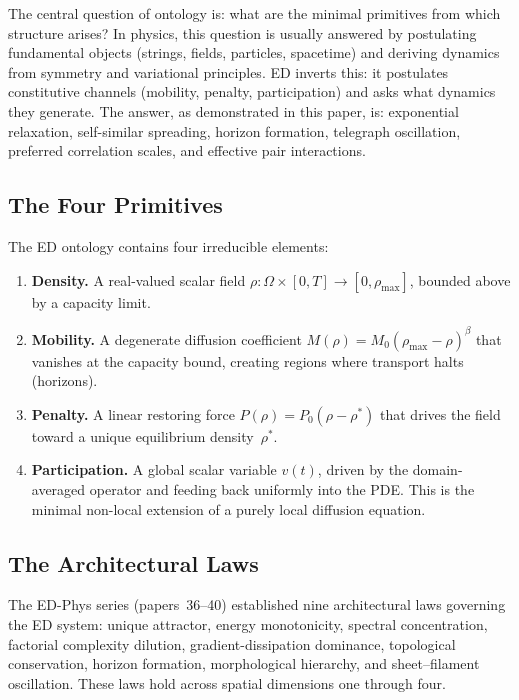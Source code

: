 \documentclass[11pt]{article}
\begin{document}
The central question of ontology is: what are the minimal primitives from which structure arises? In physics, this question is usually answered by postulating fundamental objects (strings, fields, particles, spacetime) and deriving dynamics from symmetry and variational principles. ED inverts this: it postulates constitutive channels (mobility, penalty, participation) and asks what dynamics they generate. The answer, as demonstrated in this paper, is: exponential relaxation, self-similar spreading, horizon formation, telegraph oscillation, preferred correlation scales, and effective pair interactions.

\subsection{The Four Primitives}

The ED ontology contains four irreducible elements:

\begin{enumerate}
  \item \textbf{Density.} A real-valued scalar field \(\rho\colon \Omega \times [0,T] \to [0, \rho_{\max}]\), bounded above by a capacity limit.

  \item \textbf{Mobility.} A degenerate diffusion coefficient \(M(\rho) = M_0(\rho_{\max} - \rho)^\beta\) that vanishes at the capacity bound, creating regions where transport halts (horizons).

  \item \textbf{Penalty.} A linear restoring force \(P(\rho) = P_0(\rho - \rho^*)\) that drives the field toward a unique equilibrium density~\(\rho^*\).

  \item \textbf{Participation.} A global scalar variable \(v(t)\), driven by the domain-averaged operator and feeding back uniformly into the PDE. This is the minimal non-local extension of a purely local diffusion equation.
\end{enumerate}

\subsection{The Architectural Laws}

The ED-Phys series (papers~36--40) established nine architectural laws governing the ED system: unique attractor, energy monotonicity, spectral concentration, factorial complexity dilution, gradient-dissipation dominance, topological conservation, horizon formation, morphological hierarchy, and sheet--filament oscillation. These laws hold across spatial dimensions one through four.
\end{document}
